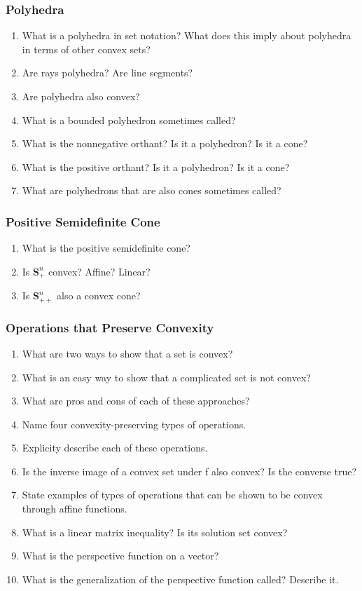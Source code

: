 \documentclass[]{article}
\newcommand{\Snp}{\boldsymbol{S}^{n}_{+}}
\newcommand{\Snpp}{\boldsymbol{S}^{n}_{++}}
\newcounter{q}
\begin{document}
\subsubsection*{Polyhedra}

\begin{enumerate}[resume*]
\item What is a polyhedra in set notation? What does this imply about polyhedra in terms of other convex sets?
\item Are rays polyhedra? Are line segments?
\item Are polyhedra also convex?
\item What is a bounded polyhedron sometimes called?
\item What is the nonnegative orthant? Is it a polyhedron? Is it a cone?
\item What is the positive orthant? Is it a polyhedron? Is it a cone?
\item What are polyhedrons that are also cones sometimes called?
\end{enumerate}

\subsubsection*{Positive Semidefinite Cone}
	
\begin{enumerate}[resume*]
\item What is the positive semidefinite cone?
\item Is $\Snp$ convex? Affine? Linear?
\item Is $\Snpp$ also a convex cone?
\end{enumerate}

\subsubsection*{Operations that Preserve Convexity}

\begin{enumerate}[resume*]
\item What are two ways to show that a set is convex?
\item What is an easy way to show that a complicated set is not convex?
\item What are pros and cons of each of these approaches?
\item Name four convexity-preserving types of operations.
\item Explicity describe each of these operations.
\item Is the inverse image of a convex set under f also convex? Is the converse true?
\item State examples of types of operations that can be shown to be convex through affine functions.
\item What is a linear matrix inequality? Is its solution set convex?
\item What is the perspective function on a vector?
\item What is the generalization of the perspective function called? Describe it.
\end{enumerate}
\end{document}
